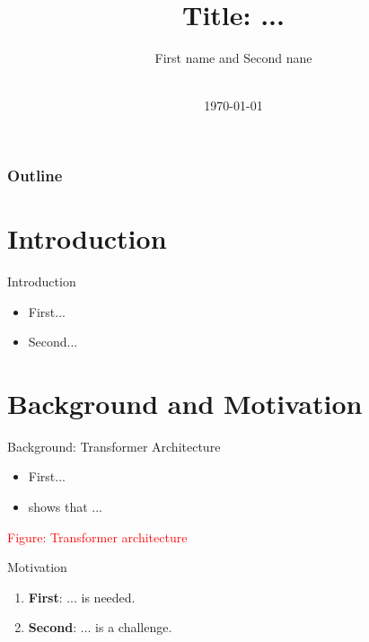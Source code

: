 \documentclass[aspectratio=43]{beamer}
\title{Title: ...} %
\author[FN LN]{First name and Second nane}
\institute[HKBU]{Hong Kong Baptist University}
\date[\mydate]{\meetingname\\\today}
\begin{document}
\begin{frame}[plain]
  \titlepage%
\end{frame}

\begin{frame}
  \frametitle{Outline}
  \tableofcontents
\end{frame}

\section{Introduction}

\begin{frame}{Introduction}
  \begin{itemize}
    \item First...
    \item Second...
  \end{itemize}
\end{frame}

\section{Background and Motivation}

\begin{frame}{Background: Transformer Architecture}
  \begin{itemize}
    \item First...
    \item \cite{NIPS2017_3f5ee243} shows that ...
  \end{itemize}

  \vspace{1cm}
  \centering
  \textcolor{red}{Figure: Transformer architecture}
  \vspace{1cm}

\end{frame}


\begin{frame}{Motivation}
  \begin{enumerate}
    \item \textbf{First}: ... is needed.
    \item \textbf{Second}: ... is a challenge.
  \end{enumerate}
\end{frame}
\end{document}
